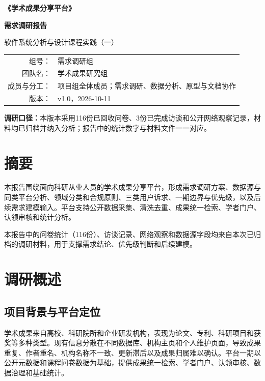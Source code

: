 \documentclass[UTF8,11pt,a4paper]{ctexart}
\begin{document}
\begin{titlepage}
\centering
\vspace*{2.2cm}
{\Huge\bfseries 《学术成果分享平台》\par}
\vspace{0.7cm}
{\LARGE\bfseries 需求调研报告\par}
\vspace{1cm}
{\large 软件系统分析与设计课程实践（一）\par}
\vfill
\begin{tabular}{rl}
组号：&需求调研组\\
团队名：&学术成果研究组\\
成员与分工：&项目组全体成员；需求调研、数据分析、原型与文档协作\\
版本：&v1.0，2026-10-11
\end{tabular}
\vfill
\begin{minipage}{0.88\textwidth}
\small\color{gray}
\textbf{调研口径：}本版本采用116份已回收问卷、3份已完成访谈和公开网络观察记录，材料均已归档并纳入分析；报告中的统计数字与材料文件一一对应。
\end{minipage}
\end{titlepage}
\tableofcontents\newpage

\section*{摘要}
本报告围绕面向科研从业人员的学术成果分享平台，形成需求调研方案、数据源与同类平台分析、领域分类和合规原则、三类用户诉求、一期边界与优先级，以及后续需求建模输入。平台支持公开数据采集、清洗去重、成果统一检索、学者门户、认领审核和统计分析。

本报告中的问卷统计（116份）、访谈记录、网络观察和数据源字段均来自本次已归档的调研材料，用于支撑需求结论、优先级判断和后续建模。

\section{调研概述}
\subsection{项目背景与平台定位}
学术成果来自高校、科研院所和企业研发机构，表现为论文、专利、科研项目和获奖等多种类型。现有信息分散在不同数据库、机构主页和个人维护页面，导致成果重复、作者重名、机构名称不一致、更新滞后以及成果归属难以确认。平台一期以公开元数据和课程问卷数据为基础，提供成果统一检索、学者门户、认领审核、数据治理和基础统计。
\end{document}
